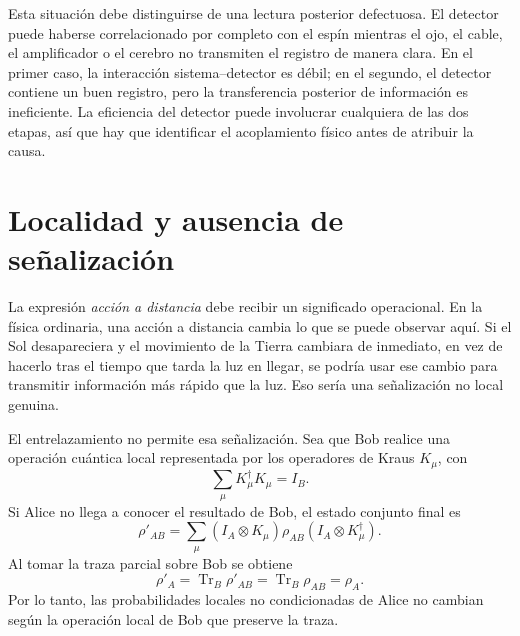 Esta situación debe distinguirse de una lectura posterior defectuosa. El detector puede haberse correlacionado por completo con el espín mientras el ojo, el cable, el amplificador o el cerebro no transmiten el registro de manera clara. En el primer caso, la interacción sistema--detector es débil; en el segundo, el detector contiene un buen registro, pero la transferencia posterior de información es ineficiente. La eficiencia del detector puede involucrar cualquiera de las dos etapas, así que hay que identificar el acoplamiento físico antes de atribuir la causa.

\begin{classroomqa}
\end{classroomqa}

\section{Localidad y ausencia de señalización}

La expresión \emph{acción a distancia} debe recibir un significado operacional. En la física ordinaria, una acción a distancia cambia lo que se puede observar aquí. Si el Sol desapareciera y el movimiento de la Tierra cambiara de inmediato, en vez de hacerlo tras el tiempo que tarda la luz en llegar, se podría usar ese cambio para transmitir información más rápido que la luz. Eso sería una señalización no local genuina.

El entrelazamiento no permite esa señalización. Sea que Bob realice una operación cuántica local representada por los operadores de Kraus \(K_\mu\), con
\begin{equation}
\sum_\mu K_\mu^\dagger K_\mu=I_B.
\end{equation}
Si Alice no llega a conocer el resultado de Bob, el estado conjunto final es
\begin{equation}
\rho'_{AB}
=\sum_\mu
(I_A\otimes K_\mu)\rho_{AB}
(I_A\otimes K_\mu^\dagger).
\end{equation}
Al tomar la traza parcial sobre Bob se obtiene
\begin{equation}
\rho'_A
=\operatorname{Tr}_B\rho'_{AB}
=\operatorname{Tr}_B\rho_{AB}
=\rho_A.
\label{eq:l7-no-signaling}
\end{equation}
Por lo tanto, las probabilidades locales no condicionadas de Alice no cambian según la operación local de Bob que preserve la traza.

